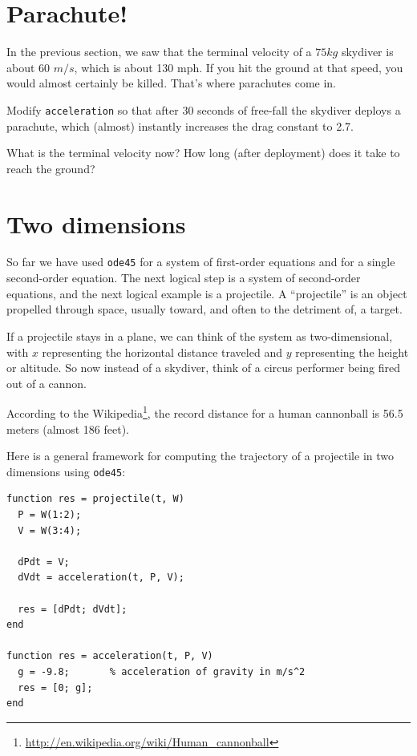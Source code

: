 \documentclass{book}
\begin{document}
\section{Parachute!}

In the previous section, we saw that the terminal velocity of a $75
kg$ skydiver is about 60 $m/s$, which is about 130 mph. If you hit
the ground at that speed, you would almost certainly be killed.
That's where parachutes come in.

\begin{ex}
Modify {\tt acceleration} so that after 30 seconds of
free-fall the skydiver deploys a parachute, which (almost) instantly
increases the drag constant to 2.7.

What is the terminal velocity now? How long (after deployment) does
it take to reach the ground?
\end{ex}


\section{Two dimensions}
\label{projectile}

So far we have used {\tt ode45} for a system of first-order
equations and for a single second-order equation. The next logical
step is a system of second-order equations, and the next logical example
is a projectile. A ``projectile'' is an object propelled
through space, usually toward, 
and often to the detriment of,
a target.

If a projectile stays in a plane, we can think of the system as
two-dimensional, with $x$ representing the horizontal distance
traveled and $y$ representing the height or altitude. So now
instead of a skydiver, think of a circus performer being fired
out of a cannon.

According to the
Wikipedia\footnote{\url{http://en.wikipedia.org/wiki/Human_cannonball}},
the record distance for a human cannonball is 56.5 meters (almost 186
feet).

Here is a general framework for computing the trajectory of a projectile
in two dimensions using {\tt ode45}:

\begin{verbatim}
function res = projectile(t, W)
  P = W(1:2);
  V = W(3:4);

  dPdt = V;             
  dVdt = acceleration(t, P, V);

  res = [dPdt; dVdt];
end

function res = acceleration(t, P, V)
  g = -9.8;       % acceleration of gravity in m/s^2
  res = [0; g];
end
\end{verbatim}
\end{document}
